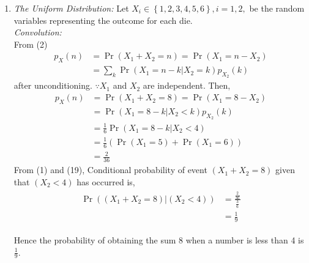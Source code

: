 \documentclass[10pt,twocolumn]{article}
\providecommand{\pr}[1]{\ensuremath{\Pr\left(#1\right)}}
\providecommand{\brak}[1]{\ensuremath{\left(#1\right)}}
\providecommand{\cbrak}[1]{\ensuremath{\left\{#1\right\}}}
\begin{document}
\begin{enumerate}
\item  {\em The Uniform Distribution: }Let $X_i \in \cbrak{1,2,3,4,5,6}, i = 1,2,$ be the random variables representing the outcome for each die. \\
{\em Convolution: } \\
From (2)
\begin{align}
p_X(n) &= \pr{X_1 + X_2 = n} = \pr{X_1  = n -X_2} \\
&= \sum_{k}^{}\pr{X_1  = n -k | X_2 = k}p_{X_2}(k)
\end{align}
after unconditioning. $\because X_1$ and $X_2$ are independent.
Then,
\begin{align}
p_X(n) &= \pr{X_1 + X_2 = 8} = \pr{X_1  = 8 -X_2} \\
&= \pr{X_1  = 8 -k | X_2 < k}p_{X_2}(k) \\
&= \frac{1}{6} \pr{X_1  = 8 -k | X_2 < 4} \\
&= \frac{1}{6} (\pr{X_1 = 5} + \pr{X_1 = 6}) \\
&= \frac{2}{36}
\end{align}
From (1) and (19), Conditional probability of event $(X_1 + X_2 = 8)$ given that $(X_2 < 4)$ has occurred is,
\begin{align}
\begin{split}
\Pr{\brak{\brak{X_1 + X_2 = 8}|\brak{X_2<4}}} &= 
\frac{\frac{2}{36}}{\frac{3}{6}}\\
&=\frac{1}{9}
\end{split}
\end{align}  

Hence the probability of obtaining the sum 8 when a number is less than 4 is $\frac{1}{9}$. 

\end{enumerate}
\end{document}

